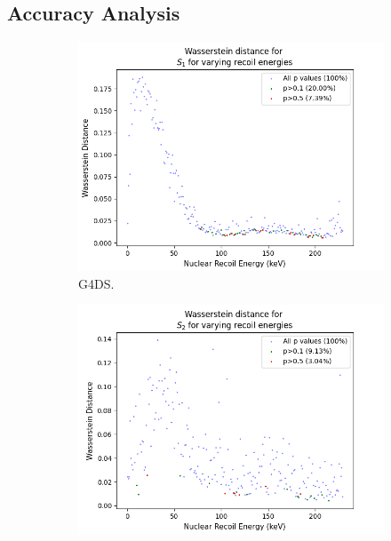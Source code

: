\documentclass[11pt]{article} %
\begin{document}
\subsection{Accuracy Analysis}
\begin{figure}[H]
\centering
\begin{minipage}{\textwidth}
  \begin{subfigure}{.5\textwidth}
      \centering\captionsetup{width=.8\linewidth}%
      \includegraphics[scale=0.5]{./images/wasserstein_distance_s1.png}
      \caption{G4DS.}
  \end{subfigure}
  \begin{subfigure}{.5\textwidth}
      \centering\captionsetup{width=.8\linewidth}%
      \includegraphics[scale=0.5]{./images/wasserstein_distance_s2.png}

\end{subfigure}
\end{minipage}
\end{figure}
\end{document}
